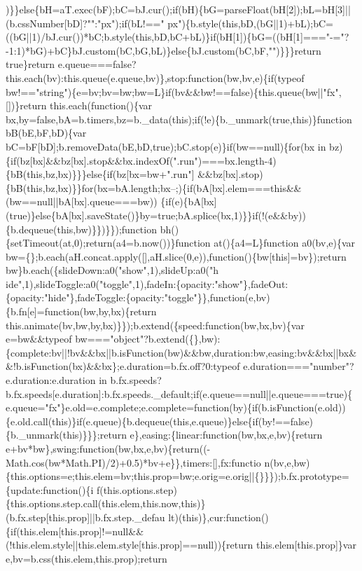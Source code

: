 \begin{DoxyCode}
{      )\}\}else\{bH=aT.exec(bF);bC=bJ.cur();if(bH)\{bG=parseFloat(bH[2]);bL=bH[3]||(b.cssNumber[bD]?"":"px");if(bL!=="
      px")\{b.style(this,bD,(bG||1)+bL);bC=((bG||1)/bJ.cur())*bC;b.style(this,bD,bC+bL)\}if(bH[1])\{bG=((bH[1]==="-="?-1:1)*bG)+bC\}bJ.custom(bC,bG,bL)\}else\{bJ.custom(bC,bF,"")\}\}\}return true\}return
       e.queue===false?this.each(bv):this.queue(e.queue,bv)\},stop:function(bw,bv,e)\{if(typeof
       bw!=="string")\{e=bv;bv=bw;bw=L\}if(bv&&bw!==false)\{this.queue(bw||"fx",[])\}return this.each(function()\{var
       bx,by=false,bA=b.timers,bz=b.\_data(this);if(!e)\{b.\_unmark(true,this)\}function bB(bE,bF,bD)\{var
       bC=bF[bD];b.removeData(bE,bD,true);bC.stop(e)\}if(bw==null)\{for(bx in
       bz)\{if(bz[bx]&&bz[bx].stop&&bx.indexOf(".run")===bx.length-4)\{bB(this,bz,bx)\}\}\}else\{if(bz[bx=bw+".run"]
      &&bz[bx].stop)\{bB(this,bz,bx)\}\}for(bx=bA.length;bx--;)\{if(bA[bx].elem===this&&(bw==null||bA[bx].queue===bw))
      \{if(e)\{bA[bx](true)\}else\{bA[bx].saveState()\}by=true;bA.splice(bx,1)\}\}if(!(e&&by))\{b.dequeue(this,bw)\}\})\}\});function bh()\{setTimeout(at,0);return(a4=b.now())\}function at()\{a4=L\}function a0(bv,e)\{var
       bw=\{\};b.each(aH.concat.apply([],aH.slice(0,e)),function()\{bw[this]=bv\});return
       bw\}b.each(\{slideDown:a0("show",1),slideUp:a0("h
      ide",1),slideToggle:a0("toggle",1),fadeIn:\{opacity:"show"\},fadeOut:\{opacity:"hide"\},fadeToggle:\{opacity:"toggle"\}\},function(e,bv)\{b.fn[e]=function(bw,by,bx)\{return
       this.animate(bv,bw,by,bx)\}\});b.extend(\{speed:function(bw,bx,bv)\{var e=bw&&typeof
       bw==="object"?b.extend(\{\},bw):\{complete:bv||!bv&&bx||b.isFunction(bw)&&bw,duration:bw,easing:bv&&bx||bx&&!b.isFunction(bx)&&bx\};e.duration=b.fx.off?0:typeof
       e.duration==="number"?e.duration:e.duration in
       b.fx.speeds?b.fx.speeds[e.duration]:b.fx.speeds.\_default;if(e.queue==null||e.queue===true)\{
      e.queue="fx"\}e.old=e.complete;e.complete=function(by)\{if(b.isFunction(e.old))\{e.old.call(this)\}if(e.queue)\{b.dequeue(this,e.queue)\}else\{if(by!==false)\{b.\_unmark(this)\}\}\};return
       e\},easing:\{linear:function(bw,bx,e,bv)\{return
       e+bv*bw\},swing:function(bw,bx,e,bv)\{return((-Math.cos(bw*Math.PI)/2)+0.5)*bv+e\}\},timers:[],fx:functio
      n(bv,e,bw)\{this.options=e;this.elem=bv;this.prop=bw;e.orig=e.orig||\{\}\}\});b.fx.prototype=\{update:function()\{i
      f(this.options.step)\{this.options.step.call(this.elem,this.now,this)\}(b.fx.step[this.prop]||b.fx.step.\_defau
      lt)(this)\},cur:function()\{if(this.elem[this.prop]!=null&&(!this.elem.style||this.elem.style[this.prop]==null))\{return this.elem[this.prop]\}var e,bv=b.css(this.elem,this.prop);return
}
\end{DoxyCode}

